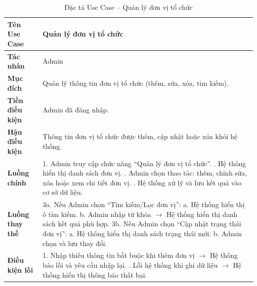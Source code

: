 \begin{table}[H]
\centering
\renewcommand{\arraystretch}{1.3}
\setlength{\tabcolsep}{8pt}
\begin{tabularx}{\textwidth}{|l|X|}
\hline
\textbf{Tên Use Case} & Quản lý đơn vị tổ chức \\ \hline
\textbf{Tác nhân} & Admin \\ \hline
\textbf{Mục đích} & Quản lý thông tin đơn vị tổ chức (thêm, sửa, xóa, tìm kiếm). \\ \hline
\textbf{Tiền điều kiện} & Admin đã đăng nhập. \\ \hline
\textbf{Hậu điều kiện} & Thông tin đơn vị tổ chức được thêm, cập nhật hoặc xóa khỏi hệ thống. \\ \hline
\textbf{Luồng chính} &
1. Admin truy cập chức năng “Quản lý đơn vị tổ chức”. \newline
2. Hệ thống hiển thị danh sách đơn vị. \newline
3. Admin chọn thao tác: thêm, chỉnh sửa, xóa hoặc xem chi tiết đơn vị. \newline
4. Hệ thống xử lý và lưu kết quả vào cơ sở dữ liệu. \\ \hline
\textbf{Luồng thay thế} &
3a. Nếu Admin chọn “Tìm kiếm/Lọc đơn vị”: \newline
\hspace*{1em}a. Hệ thống hiển thị ô tìm kiếm. \newline
\hspace*{1em}b. Admin nhập từ khóa $\rightarrow$ Hệ thống hiển thị danh sách kết quả phù hợp. \newline
3b. Nếu Admin chọn “Cập nhật trạng thái đơn vị”: \newline
\hspace*{1em}a. Hệ thống hiển thị danh sách trạng thái mới. \newline
\hspace*{1em}b. Admin chọn và lưu thay đổi. \\ \hline
\textbf{Điều kiện lỗi} &
1. Nhập thiếu thông tin bắt buộc khi thêm đơn vị $\rightarrow$ Hệ thống báo lỗi và yêu cầu nhập lại. \newline
2. Lỗi hệ thống khi ghi dữ liệu $\rightarrow$ Hệ thống hiển thị thông báo thất bại. \\ \hline
\end{tabularx}
\vspace{15pt}
\caption{Đặc tả Use Case -- Quản lý đơn vị tổ chức}
\label{tab:uc_manage_organizer}
\end{table}

